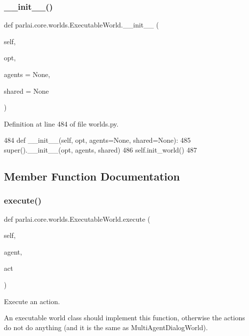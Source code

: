 \subsubsection{\texorpdfstring{\+\_\+\+\_\+init\+\_\+\+\_\+()}{\_\_init\_\_()}}
{\footnotesize\ttfamily def parlai.\+core.\+worlds.\+Executable\+World.\+\_\+\+\_\+init\+\_\+\+\_\+ (\begin{DoxyParamCaption}\item[{}]{self,  }\item[{}]{opt,  }\item[{}]{agents = {\ttfamily None},  }\item[{}]{shared = {\ttfamily None} }\end{DoxyParamCaption})}



Definition at line 484 of file worlds.\+py.


\begin{DoxyCode}
484     \textcolor{keyword}{def }\_\_init\_\_(self, opt, agents=None, shared=None):
485         super().\_\_init\_\_(opt, agents, shared)
486         self.init\_world()
487 
\end{DoxyCode}


\subsection{Member Function Documentation}
\mbox{\label{classparlai_1_1core_1_1worlds_1_1ExecutableWorld_a318fbf7c75178f62a6d46647f1a063fa}} 
\subsubsection{\texorpdfstring{execute()}{execute()}}
{\footnotesize\ttfamily def parlai.\+core.\+worlds.\+Executable\+World.\+execute (\begin{DoxyParamCaption}\item[{}]{self,  }\item[{}]{agent,  }\item[{}]{act }\end{DoxyParamCaption})}

\begin{DoxyVerb}Execute an action.

An executable world class should implement this function, otherwise the actions
do not do anything (and it is the same as MultiAgentDialogWorld).
\end{DoxyVerb}
 

